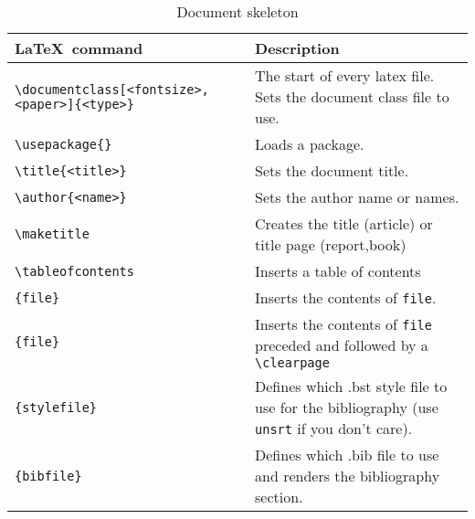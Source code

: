 \documentclass{article}
\begin{document}
\begin{table}[htbp]
\caption{Document skeleton}
\begin{tabularx}{\textwidth}{lX}
	\toprule
	\LaTeX~command                                    & Description                                                                                     \\ 
	\midrule
	\verb|\documentclass|\verb|[<fontsize>,<paper>]{<type>}| & The start of every latex file. Sets the document class file to use.                             \\
	\verb|\usepackage|\verb|{}|                              & Loads a package.                                                                                \\
	\verb|\title|\verb|{<title>}|                            & Sets the document title.                                                                        \\
	\verb|\author|\verb|{<name>}|                            & Sets the author name or names.                                                                  \\
	\verb|\maketitle|                                 & Creates the title (article) or title page (report,book)                                         \\
	\verb|\tableofcontents|                           & Inserts a table of contents                                                                     \\
	\verb||\verb|{file}|                               & Inserts the contents of \verb|file|.                                                            \\
	\verb||\verb|{file}|                             & Inserts the contents of \verb|file| preceded and followed by a \verb|\clearpage|                \\
	\verb||\verb|{stylefile}|              & Defines which .bst style file to use for the bibliography (use \verb|unsrt| if you don't care). \\
	\verb||\verb|{bibfile}|                  & Defines which .bib file to use and renders the bibliography section.                      \\ 
	\bottomrule
\end{tabularx}
\end{table}
\end{document}
